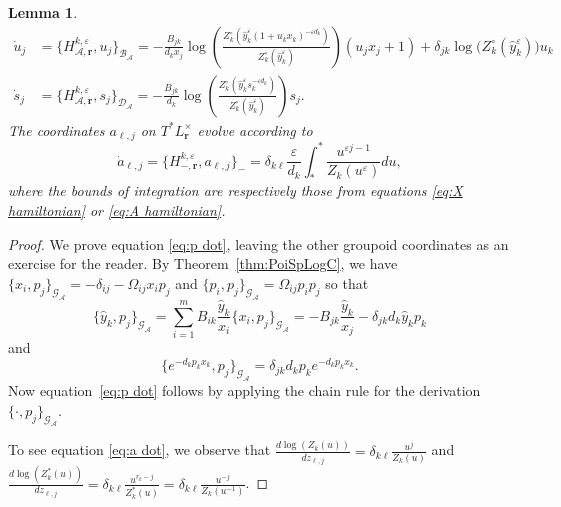 \documentclass{amsart}
\newtheorem{lemma}[theorem]{Lemma}
\numberwithin{equation}{section}
\newcommand{\bfr}{{\boldsymbol{r}}}
\newcommand{\cA}{\mathcal{A}}
\newcommand{\cB}{\mathcal{B}}
\newcommand{\cD}{\mathcal{D}}
\newcommand{\cG}{\mathcal{G}}
\begin{document}
\begin{lemma}
\begin{align}
    \dot u_j&=\{H_{\cA,\bfr}^{k,\varepsilon},u_j\}_{\cB_\cA}=-\frac{B_{jk}}{d_kx_j}\log\left(\frac{Z_k^\circ\left(\hat y_k^\varepsilon (1+u_kx_k)^{-\varepsilon d_k}\right)}{Z_k^\circ(\hat y_k^\varepsilon)}\right)(u_jx_j+1)+\delta_{jk}\log\big(Z_k^\circ(\hat y_k^\varepsilon)\big)u_k\\
    \nonumber
    \dot s_j&=\{H_{\cA,\bfr}^{k,\varepsilon},s_j\}_{\cD_\cA}=-\frac{B_{jk}}{d_k}\log\left(\frac{Z_k^\circ\left(\hat y_k^\varepsilon s_k^{-\varepsilon d_k}\right)}{Z_k^\circ(\hat y_k^\varepsilon)}\right)s_j.
  \end{align}
  The coordinates $a_{\ell,j}$ on $T^*L^\times_\bfr$ evolve according to
  \begin{equation}
    \label{eq:a dot}
    \dot a_{\ell,j}=\{H_{-,\bfr}^{k,\varepsilon},a_{\ell,j}\}_-=\delta_{k\ell}\frac{\varepsilon}{d_k}\int_*^* \frac{u^{\varepsilon j-1}}{Z_k(u^\varepsilon)}du, 
  \end{equation}
  where the bounds of integration are respectively those from equations \eqref{eq:X hamiltonian} or \eqref{eq:A hamiltonian}.
\end{lemma}
\begin{proof}
  We prove equation \eqref{eq:p dot}, leaving the other groupoid coordinates as an exercise for the reader.
  By Theorem~\ref{thm:PoiSpLogC}, we have $\{x_i,p_j\}_{\cG_\cA}=-\delta_{ij}-\Omega_{ij}x_ip_j$ and $\{p_i,p_j\}_{\cG_\cA}=\Omega_{ij}p_ip_j$ so that
  \[\{\hat y_k,p_j\}_{\cG_\cA}=\sum_{i=1}^m B_{ik}\frac{\hat y_k}{x_i}\{x_i,p_j\}_{\cG_\cA}=-B_{jk}\frac{\hat y_k}{x_j}-\delta_{jk}d_k\hat y_kp_k\]
  and
  \[\{e^{-d_kp_kx_k},p_j\}_{\cG_\cA}=\delta_{jk}d_kp_ke^{-d_kp_kx_k}.\]
  Now equation~\eqref{eq:p dot} follows by applying the chain rule for the derivation $\{\cdot,p_j\}_{\cG_\cA}$.

  To see equation \eqref{eq:a dot}, we observe that $\frac{d\log(Z_k(u))}{dz_{\ell,j}}=\delta_{k\ell}\frac{u^j}{Z_k(u)}$ and $\frac{d\log(Z_k^*(u))}{dz_{\ell,j}}=\delta_{k\ell}\frac{u^{r_k-j}}{Z_k^*(u)}=\delta_{k\ell}\frac{u^{-j}}{Z_k(u^{-1})}$.
\end{proof}
\end{document}
